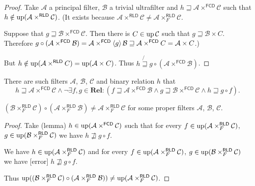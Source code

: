 \begin{proof}
  Take $\mathcal{A}$ a principal filter, $\mathcal{B}$ a trivial ultrafilter
  and $h \sqsupseteq \mathcal{A} \times^{\mathsf{FCD}} \mathcal{C}$
  such that $h \notin \operatorname{up} (\mathcal{A} \times^{\mathsf{RLD}}
  \mathcal{C})$. (It exists because $\mathcal{A} \times^{\mathsf{RLD}}
  \mathcal{C} \neq \mathcal{A} \times^{\mathsf{RLD}}_F \mathcal{C}$.

  Suppose that $g \sqsupseteq \mathcal{B} \times^{\mathsf{FCD}}
  \mathcal{C}$. Then there is $C \in \operatorname{up} \mathcal{C}$ such that $g
  \sqsupseteq \mathcal{B} \times C$. Therefore $g \circ (\mathcal{A}
  \times^{\mathsf{FCD}} \mathcal{B}) = \mathcal{A}
  \times^{\mathsf{FCD}} \left\langle g\right\rangle \mathcal{B} \sqsupseteq
  \mathcal{A} \times^{\mathsf{FCD}} C = \mathcal{A} \times C$.)

  But $h \notin \operatorname{up} (\mathcal{A} \times^{\mathsf{RLD}} C) =
  \operatorname{up} (\mathcal{A} \times C)$. Thus $h \mathrel{\not{\sqsupseteq}} g
  \circ (\mathcal{A} \times^{\mathsf{FCD}} \mathcal{B})$.
\end{proof}

\begin{cor}
  There are such filters $\mathcal{A}$, $\mathcal{B}$, $\mathcal{C}$ and
  binary relation $h$ that
  \[ h \sqsupseteq \mathcal{A} \times^{\mathsf{FCD}} \mathcal{C} \wedge
     \neg \exists f, g \in \mathbf{Rel} : (f \sqsupseteq \mathcal{A}
     \times^{\mathsf{FCD}} \mathcal{B} \wedge g \sqsupseteq \mathcal{B}
     \times^{\mathsf{FCD}} \mathcal{C} \wedge h \sqsupseteq g \circ f)
     . \]
\end{cor}

\begin{prop}
  $(\mathcal{B} \times^{\mathsf{RLD}}_F \mathcal{C}) \circ (\mathcal{A}
  \times^{\mathsf{RLD}}_F \mathcal{B}) \neq \mathcal{A}
  \times^{\mathsf{RLD}}_F \mathcal{C}$ for some proper filters
  $\mathcal{A}$, $\mathcal{B}$, $\mathcal{C}$.
\end{prop}

\begin{proof}

  Take (lemma)
  $h \in \operatorname{up} (\mathcal{A}\times^{\mathsf{FCD}} \mathcal{C})$
  such that for every $f \in \operatorname{up}
  (\mathcal{A} \times^{\mathsf{RLD}}_F \mathcal{C})$, $g \in \operatorname{up}
  (\mathcal{B} \times^{\mathsf{RLD}}_F \mathcal{C})$ we have
  $h \nsqsupseteq g \circ f$.

  We have $h \in \operatorname{up} (\mathcal{A} \times^{\mathsf{RLD}}_F
  \mathcal{C})$ and for every $f \in \operatorname{up}
  (\mathcal{A} \times^{\mathsf{RLD}}_F \mathcal{C})$, $g \in \operatorname{up}
  (\mathcal{B} \times^{\mathsf{RLD}}_F \mathcal{C})$ we have
  [error] $h \nsqsupseteq g \circ f$.

  Thus $\operatorname{up}
  ((\mathcal{B} \times^{\mathsf{RLD}}_F \mathcal{C}) \circ (\mathcal{A}
  \times^{\mathsf{RLD}}_F \mathcal{B})) \neq \operatorname{up} (\mathcal{A}
  \times^{\mathsf{RLD}}_F \mathcal{C})$.
\end{proof}
